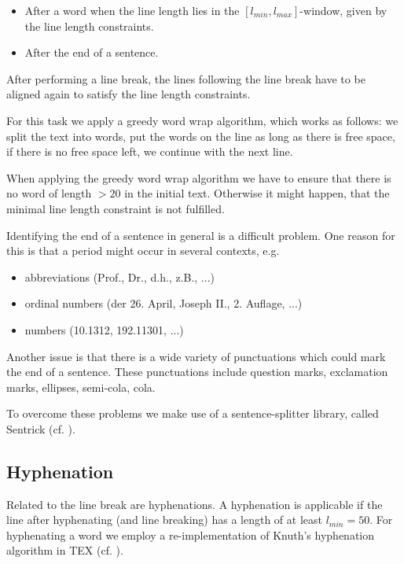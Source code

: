 \documentclass[11pt]{reportAlternative}
\begin{document}
\begin{itemize}
	\item After a word when the line length lies in the $[l_{min},l_{max}]$-window,
	given by the line length constraints.
	\item After the end of a sentence.
\end{itemize}
After performing a line break, the lines following the line break have
to be aligned again to satisfy the line length constraints.

For this task we apply a greedy word wrap algorithm, which works as follows: we split the text into words,
put the words on the line as long as there is free space, if there is no free space left, we continue with the next line.

When applying the greedy word wrap algorithm we have to ensure that
there is no word of length $> 20$ in the initial text. Otherwise it might happen, that the minimal line
length constraint is not fulfilled.

Identifying the end of a sentence in general is a difficult problem. One reason for this is that a period
might occur in several contexts, e.g.

\begin{itemize}

	\item abbreviations (Prof., Dr., d.h., z.B., ...)
	\item ordinal numbers (der 26. April, Joseph II., 2. Auflage, ...)
	\item numbers (10.1312, 192.11301, ...)

\end{itemize}

Another issue is that there is a wide variety of punctuations which could mark the end of a sentence. These punctuations include question marks, exclamation marks, ellipses, semi-cola, cola.

To overcome these problems we make use of a sentence-splitter library, called Sentrick (cf. \cite{Sentrick}).

\subsection{Hyphenation}
Related to the line break are hyphenations. A hyphenation is applicable if the line after hyphenating (and line breaking) has a length of at least $l_{min}=50$.
For hyphenating a word we employ a re-implementation of Knuth's hyphenation algorithm in TEX (cf. \cite{Hyphenation}).
\end{document}
